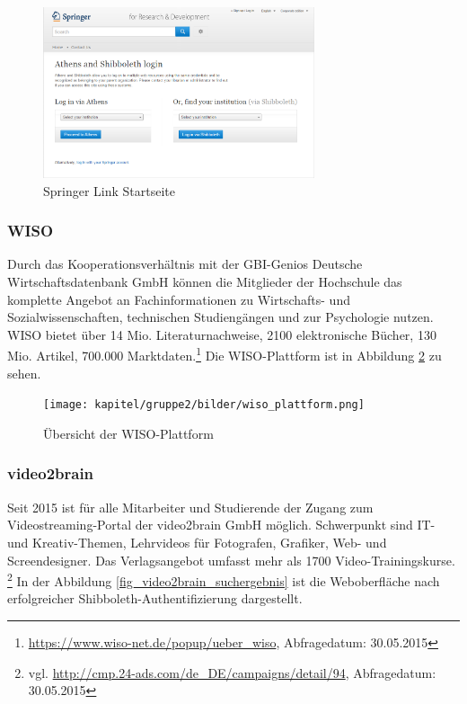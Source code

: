 \begin{figure}[h!]
	\centering
	\includegraphics[width=8cm]{kapitel/gruppe2/bilder/springerlink_startseite}
	\caption{Springer Link Startseite \protect\footnotemark}
	\label{fig_springerlink_startseite}
\end{figure}

\subsubsection{WISO}
Durch das Kooperationsverhältnis mit der GBI-Genios Deutsche Wirtschaftsdatenbank GmbH können die Mitglieder der Hochschule das komplette Angebot an Fachinformationen zu Wirtschafts- und Sozialwissenschaften, technischen Studiengängen und zur Psychologie  nutzen. WISO bietet über 14 Mio. Literaturnachweise, 2100 elektronische Bücher, 130 Mio. Artikel, 700.000 Marktdaten.\footnote{\url{https://www.wiso-net.de/popup/ueber_wiso}, Abfragedatum: 30.05.2015} Die WISO-Plattform ist in Abbildung \ref{fig_wiso_plattform.png} zu sehen.

\begin{figure}[h!]
	\centering
	\texttt{[image: kapitel/gruppe2/bilder/wiso\_plattform.png]}
	\caption{Übersicht der WISO-Plattform \protect\footnotemark}
	\label{fig_wiso_plattform.png}
\end{figure}

\subsubsection{video2brain}
Seit 2015 ist für alle Mitarbeiter und Studierende der Zugang zum Videostreaming-Portal der video2brain GmbH möglich. Schwerpunkt sind IT- und Kreativ-Themen, Lehrvideos für Fotografen, Grafiker, Web- und Screendesigner. Das Verlagsangebot umfasst mehr als 1700 Video-Trainingskurse. \footnote{vgl. \url{http://cmp.24-ads.com/de_DE/campaigns/detail/94}, Abfragedatum: 30.05.2015} In der Abbildung \ref{fig_video2brain_suchergebnis} ist die Weboberfläche nach erfolgreicher Shibboleth-Authentifizierung dargestellt.

